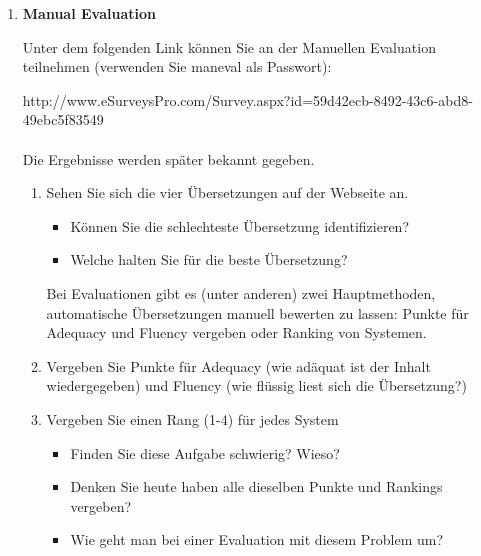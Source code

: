 \documentclass[12pt,fleqn]{article}
\begin{document}
\vspace{0.5cm} 
\begin{enumerate}

\item \textbf{Manual Evaluation} 

\vspace{0.5cm} 
Unter dem folgenden Link können Sie an der Manuellen Evaluation teilnehmen (verwenden Sie maneval als Passwort): 

http://www.eSurveysPro.com/Survey.aspx?id=59d42ecb-8492-43c6-abd8-49ebc5f83549\\ \\
Die Ergebnisse werden später bekannt gegeben.
\vspace{0.5cm} 
\begin{enumerate} 
\item Sehen Sie sich die vier Übersetzungen auf der Webseite an.

\vspace{0.5cm} 
\begin{itemize} 
\item Können Sie die schlechteste Übersetzung identifizieren? 
\item Welche halten Sie für die beste Übersetzung?
\end{itemize} 


\vspace{0.5cm} 
Bei Evaluationen gibt es (unter anderen) zwei Hauptmethoden, automatische Übersetzungen manuell bewerten zu lassen: Punkte für Adequacy und Fluency vergeben oder Ranking von Systemen.

\vspace{0.5cm} 
\item Vergeben Sie Punkte für Adequacy (wie adäquat ist der Inhalt wiedergegeben) und Fluency (wie flüssig liest sich die Übersetzung?)

\vspace{0.5cm} 
\item Vergeben Sie einen Rang (1-4) für jedes System

\begin{itemize} 
\item Finden Sie diese Aufgabe schwierig? Wieso?
\item Denken Sie heute haben alle dieselben Punkte und Rankings vergeben? 
\item Wie geht man bei einer Evaluation mit diesem Problem um?
\end{itemize} 
\end{enumerate} 


\end{enumerate}
\end{document}
